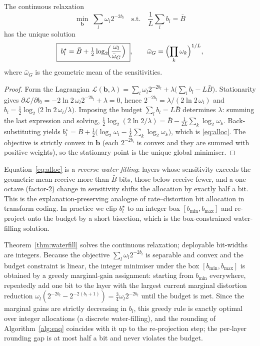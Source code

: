 \begin{theorem}
\label{thm:waterfill}
The continuous relaxation
\begin{equation}
\min_{\bm b}\;\sum_{l}\omega_l 2^{-2b_l}\quad\text{s.t.}\quad
\frac1L\sum_l b_l=\bar B
\label{eq:opt}
\end{equation}
has the unique solution
\begin{equation}
\boxed{\;b_l^{\star}=\bar B+\tfrac12\log_2\!\Bigl(\frac{\omega_l}{\bar\omega_G}
\Bigr)\;},\qquad
\bar\omega_G=\Bigl(\prod_{k}\omega_k\Bigr)^{1/L},
\label{eq:alloc}
\end{equation}
where $\bar\omega_G$ is the geometric mean of the sensitivities.
\end{theorem}

\begin{proof}
Form the Lagrangian $\mathcal L(\bm b,\lambda)=\sum_l\omega_l2^{-2b_l}+
\lambda\bigl(\sum_l b_l-L\bar B\bigr)$. Stationarity gives
$\partial\mathcal L/\partial b_l=-2\ln2\,\omega_l2^{-2b_l}+\lambda=0$, hence
$2^{-2b_l}=\lambda/(2\ln2\,\omega_l)$ and
$b_l=\tfrac12\log_2\!\bigl(2\ln2\,\omega_l/\lambda\bigr)$. Imposing the budget
$\sum_l b_l=L\bar B$ determines $\lambda$: summing the last expression and solving,
$\tfrac12\log_2(2\ln2/\lambda)=\bar B-\tfrac1{2L}\sum_k\log_2\omega_k$.
Back-substituting yields
$b_l^\star=\bar B+\tfrac12\bigl(\log_2\omega_l-\tfrac1L\sum_k\log_2\omega_k\bigr)$,
which is \eqref{eq:alloc}. The objective is strictly convex in $\bm b$
(each $2^{-2b_l}$ is convex and they are summed with positive weights), so the
stationary point is the unique global minimiser.
\end{proof}

Equation~\eqref{eq:alloc} is a \emph{reverse water-filling}: layers whose
sensitivity exceeds the geometric mean receive more than $\bar B$ bits, those
below receive fewer, and a one-octave (factor-$2$) change in sensitivity shifts
the allocation by exactly half a bit. This is the explanation-preserving analogue
of rate--distortion bit allocation in transform coding. In practice we clip
$b_l^\star$ to an integer box $[b_{\min},b_{\max}]$ and re-project onto the budget
by a short bisection, which is the box-constrained water-filling solution.

\begin{remark}
\label{rem:integer}
Theorem~\ref{thm:waterfill} solves the continuous relaxation; deployable
bit-widths are integers. Because the objective $\sum_l\omega_l2^{-2b_l}$ is
separable and convex and the budget constraint is linear, the integer minimiser
under the box $[b_{\min},b_{\max}]$ is obtained by a greedy marginal-gain
assignment: starting from $b_{\min}$ everywhere, repeatedly add one bit to the
layer with the largest current marginal distortion reduction
$\omega_l(2^{-2b_l}-2^{-2(b_l+1)})=\tfrac34\omega_l2^{-2b_l}$ until the budget is
met. Since the marginal gains are strictly decreasing in $b_l$, this greedy rule
is exactly optimal over integer allocations (a discrete water-filling), and the
rounding of Algorithm~\ref{alg:eaq} coincides with it up to the re-projection
step; the per-layer rounding gap is at most half a bit and never violates the
budget.
\end{remark}

